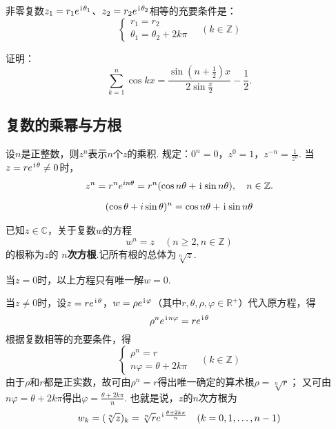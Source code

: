 \begin{theorem}[指数形式下复数相等条件]
非零复数\(z_1=r_1 e^{\kern1pt\mathrm{i}\kern1pt\theta_1}\)、\(z_2=r_2 e^{\kern1pt\mathrm{i}\kern1pt\theta_2}\)相等的充要条件是：\[
\left\{ \begin{array}{l}
r_1 = r_2 \\
\theta_1 = \theta_2 + 2k\pi
\end{array} \right. \quad (k \in \mathbb{Z})
\]
\end{theorem}

\begin{example}
证明：\[
\sum\limits_{k=1}^n \cos kx
= \frac{\sin \left(n+\frac{1}{2}\right)x}{2 \sin \frac{x}{2}} - \frac{1}{2}.
\]
\end{example}

\subsection{复数的乘幂与方根}
\begin{definition}
设\(n\)是正整数，则\(z^n\)表示\(n\)个\(z\)的乘积.
规定：\(0^n=0\)，\(z^0=1\)，\(z^{-n}=\frac{1}{z^n}\).
当\(z=re^{\kern1pt\mathrm{i}\kern1pt\theta} \neq 0\)时，\[
z^n = r^n e^{in\theta} = r^n(\cos n\theta+\kern1pt\mathrm{i}\kern1pt\sin n\theta),
\quad n \in \mathbb{Z}.
\]
\end{definition}

\begin{theorem}
\begin{align}
(\cos\theta+i\sin\theta)^n = \cos{n\theta}+\kern1pt\mathrm{i}\kern1pt\sin{n\theta}
\end{align}
\end{theorem}

\begin{definition}[复数的方根]
已知\(z\in\mathbb{C}\)，关于复数\(w\)的方程\[
w^n = z \quad (n \geqslant 2, n \in \mathbb{Z})
\]的根称为\(z\)的\textbf{ \(n\)次方根}.记所有根的总体为\(\sqrt[n]{z}\).

当\(z=0\)时，以上方程只有唯一解\(w = 0\).

当\(z \neq 0\)时，设\(z=re^{\kern1pt\mathrm{i}\kern1pt\theta}\)，\(w=\rho e^{\kern1pt\mathrm{i}\kern1pt\varphi}\)（其中\(r,\theta,\rho,\varphi\in\mathbb{R}^+\)）代入原方程，得\[
\rho^n e^{\kern1pt\mathrm{i}\kern1pt n \varphi} = r e^{\kern1pt\mathrm{i}\kern1pt\theta}
\]根据复数相等的充要条件，得\[
\left\{ \begin{array}{l}
\rho^n = r \\
n\varphi = \theta + 2k\pi
\end{array} \right. \quad (k \in \mathbb{Z})
\]由于\(\rho\)和\(r\)都是正实数，故可由\(\rho^n=r\)得出唯一确定的算术根\(\rho=\sqrt[n]{r}\)；
又可由\(n\varphi=\theta+2k\pi\)得出\(\varphi=\frac{\theta+2k\pi}{n}\).
也就是说，\(z\)的\(n\)次方根为\[
w_k = (\sqrt[n]{z})_k = \sqrt[n]{r} e^{\kern1pt\mathrm{i}\kern1pt \frac{\theta + 2k\pi}{n}} \quad (k=0,1,\dotsc,n-1)
\]
\end{definition}

